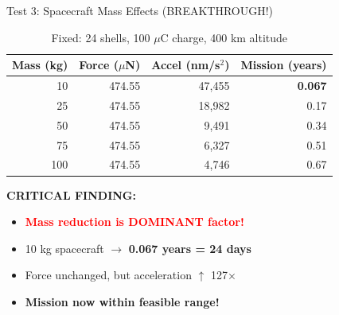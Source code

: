 \documentclass[11pt]{beamer}
\begin{document}
\begin{frame}{Test 3: Spacecraft Mass Effects (BREAKTHROUGH!)}

\begin{table}[h]
\centering
\begin{tabular}{rrrr}
\toprule
\textbf{Mass (kg)} & \textbf{Force ($\mu$N)} & \textbf{Accel (nm/s$^2$)} & \textbf{Mission (years)} \\
\midrule
\rowcolor{green!20}
10 & 474.55 & 47,455 & \textbf{0.067} \\
25 & 474.55 & 18,982 & 0.17 \\
50 & 474.55 & 9,491 & 0.34 \\
75 & 474.55 & 6,327 & 0.51 \\
100 & 474.55 & 4,746 & 0.67 \\
\bottomrule
\end{tabular}
\caption{Fixed: 24 shells, 100 $\mu$C charge, 400 km altitude}
\end{table}

\vspace{0.3cm}

\textbf{CRITICAL FINDING:}
\begin{itemize}
\item \textcolor{red}{\textbf{Mass reduction is DOMINANT factor!}}
\item 10 kg spacecraft $\rightarrow$ \textbf{0.067 years = 24 days}
\item Force unchanged, but acceleration $\uparrow$ 127$\times$
\item \textbf{Mission now within feasible range!}
\end{itemize}

\end{frame}
\end{document}
